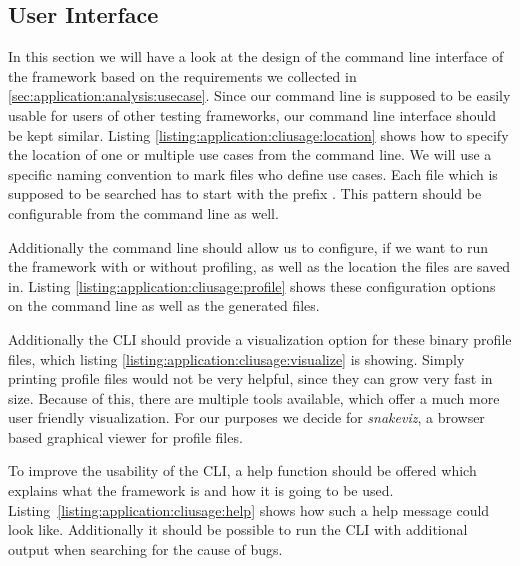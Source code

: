 \subsection{User Interface}

In this section we will have a look at the design of the command line interface
of the framework based on the requirements we collected in
\ref{sec:application:analysis:usecase}. Since our command line is supposed to be
easily usable for users of other testing frameworks, our command line interface
should be kept similar. Listing \ref{listing:application:cliusage:location}
shows how to specify the location of one or multiple use cases from the command
line. We will use a specific naming convention to mark files who define use
cases. Each file which is supposed to be searched has to start with the prefix
. This pattern should be configurable from the command
line as well.



Additionally the command line should allow us to configure, if we want to run
the framework with or without profiling, as well as the location the files are
saved in. Listing \ref{listing:application:cliusage:profile} shows these
configuration options on the command line as well as the generated files.



Additionally the CLI should provide a visualization option for these binary
profile files, which listing \ref{listing:application:cliusage:visualize} is
showing. Simply printing profile files would not be very helpful, since they can
grow very fast in size. Because of this, there are multiple tools available,
which offer a much more user friendly visualization. For our purposes we decide
for \emph{snakeviz}, a browser based graphical viewer for profile files.


To improve the usability of the CLI, a help function should be offered which
explains what the framework is and how it is going to be used.
Listing \ref{listing:application:cliusage:help} shows how such a help message
could look like. Additionally it should be possible to run the CLI with
additional output when searching for the cause of bugs. 

